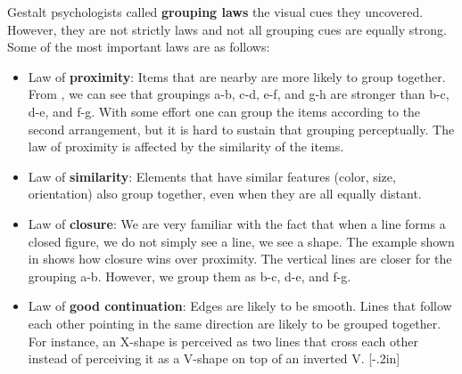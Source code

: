 Gestalt psychologists called {\bf grouping laws}
the visual cues they uncovered. However, they are not strictly laws and not all grouping cues are equally strong. Some of the most important laws are as follows:
\begin{itemize}
    \item Law of {\bf proximity}: Items that are nearby are more likely to group together. From \fig{\ref{fig:gestalt}}, we can see that groupings a-b, c-d, e-f, and g-h are stronger than b-c, d-e, and f-g. With some effort one can group the items according to the second arrangement, but it is hard to sustain that grouping perceptually. The law of proximity is affected by the similarity of the items.
    \item Law of {\bf similarity}: Elements that have similar features (color, size, orientation) also group together, even when they are all equally distant.
    \item Law of {\bf closure}: We are very familiar with the fact that when a line forms a closed figure, we do not simply see a line, we see a shape. The example shown in \fig{\ref{fig:gestalt}} shows how closure wins over proximity. The vertical lines are closer for the grouping a-b. However, we group them as b-c, d-e, and f-g.
    \item Law of {\bf good continuation}: Edges are likely to be smooth. Lines that follow each other pointing in the same direction are likely to be grouped together. For instance, an X-shape is perceived as two lines that cross each other instead of perceiving it as a V-shape on top of an inverted V.
          [-.2in]


\end{itemize}
